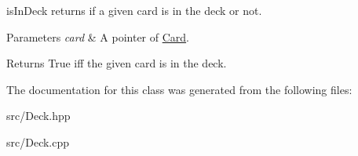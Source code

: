 is\-In\-Deck returns if a given card is in the deck or not. 


\begin{DoxyParams}{Parameters}
{\em card} & A pointer of \hyperlink{classCard}{Card}. \\
\hline
\end{DoxyParams}
\begin{DoxyReturn}{Returns}
True iff the given card is in the deck. 
\end{DoxyReturn}


The documentation for this class was generated from the following files\-:\begin{DoxyCompactItemize}
\item 
src/Deck.\-hpp\item 
src/Deck.\-cpp\end{DoxyCompactItemize}
